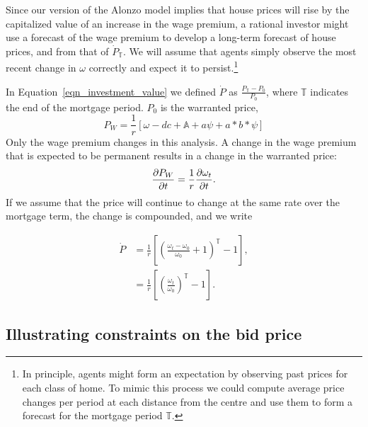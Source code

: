 Since our version of the \gls{Alonzo model} implies that house prices will rise by the capitalized value of an increase in the wage premium, a rational investor might use a forecast of the wage premium to develop a long-term forecast of house prices, and from that of $\dot P_\mathbb{T}$. %
We will assume that agents simply observe the most recent change in $\omega$  correctly and expect it to persist.\footnote{In principle, agents might form an expectation by observing past prices for each class of home. To mimic this process we could compute average price changes per period at each distance from the centre and use them to form a forecast for the mortgage period $\mathbb{T}$. }

In Equation~\ref{eqn_investment_value} we defined $\dot P$ as $\frac{P_\mathbb{T}-P_0}{P_0} $, where $\mathbb{T}$ indicates the end of the mortgage period. $P_0$ is the warranted price, 
\[P_W =\frac{1}{r}\left[\omega - {dc} + \mathbb{A} + a\psi\nonumber  + a*b*\psi\right]\]
Only the wage premium changes in this analysis. A change in the wage premium that is expected to be permanent results in a change in the warranted price:  \[\frac{\partial P_W}{\partial t} = \frac{1}{r}\frac{\partial \omega_t}{\partial t}.\]
If we assume that the price will continue to change at the same rate over the mortgage term, the change is compounded, and we write




\begin{align}
\dot P  &= \frac{1}{r}\left[\left(\frac{\omega_t-\omega_0}{\omega_0}+1 \right)^\mathbb{T}-1\right], \nonumber\\
        &=\frac{1}{r}\left[\left(\frac{\omega_t}{\omega_0} \right)^\mathbb{T}-1\right]. \nonumber
\end{align}



\subsection{Illustrating constraints on the bid price} \label{sec:bids-and-reservation}
 
